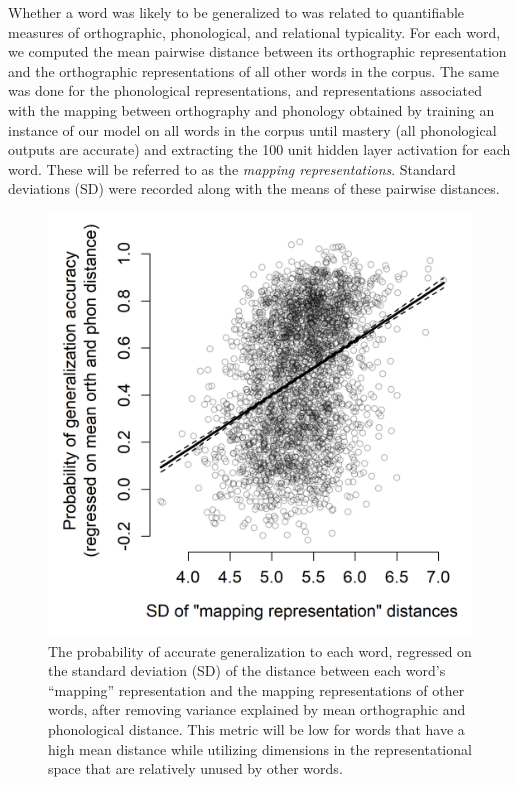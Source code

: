 \documentclass[10pt,letterpaper]{article}
\begin{document}
Whether a word was likely to be generalized to was related to quantifiable measures of orthographic, phonological, and relational typicality. For each word, we computed the mean pairwise distance between its orthographic representation and the orthographic representations of all other words in the corpus. The same was done for the phonological representations, and representations associated with the mapping between orthography and phonology obtained by training an instance of our model on all words in the corpus until mastery (all phonological outputs are accurate) and extracting the 100 unit hidden layer activation for each word. These will be referred to as the \emph{mapping representations}. Standard deviations (SD) were recorded along with the means of these pairwise distances.

\begin{figure}[t]
	\includegraphics[width=0.9\columnwidth]{figures/word_accuracy_by_hiddenSD.png}
	
	\caption{The probability of accurate generalization to each word, regressed on the standard deviation (SD) of the distance between each word's ``mapping'' representation and the mapping representations of other words, after removing variance explained by mean orthographic and phonological distance. This metric will be low for words that have a high mean distance while utilizing dimensions in the representational space that are relatively unused by other words.}
	\label{word_acc_regression}
\end{figure}
\end{document}
